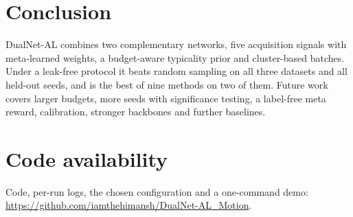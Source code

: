\documentclass[conference,a4paper]{IEEEtran}
\begin{document}
\section{Conclusion}
DualNet-AL combines two complementary networks, five acquisition signals with meta-learned weights, a budget-aware
typicality prior and cluster-based batches. Under a leak-free protocol it beats random sampling on all three datasets
and all held-out seeds, and is the best of nine methods on two of them. Future work covers larger budgets, more seeds
with significance testing, a label-free meta reward, calibration, stronger backbones and further baselines.

\section*{Code availability}
Code, per-run logs, the chosen configuration and a one-command demo: \url{https://github.com/iamthehimansh/DualNet-AL_Motion}.
\end{document}
